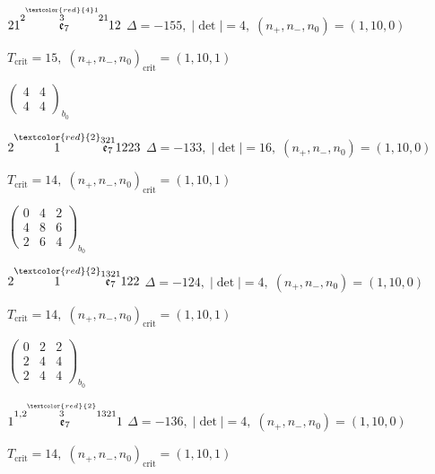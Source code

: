 \documentclass[10pt]{article}
\begin{document}
$21\overset{2\overset{\textcolor{red}{4}1}{3}21}{\mathfrak{e}_7}12$ \quad $\Delta=-155,\; |\det|=4,\; (n_+,n_-,n_0)=(1,10,0)$

\hspace{1em}$T_{\text{crit}}=15,\; (n_+,n_-,n_0)_{\text{crit}}=(1,10,1)$

\hspace{2em}$\left(\begin{smallmatrix}4 & 4 \\ 4 & 4\end{smallmatrix}\right)_{\!b_0}$

\smallskip

$2\overset{\textcolor{red}{2}}{1}\overset{321}{\mathfrak{e}_7}1223$ \quad $\Delta=-133,\; |\det|=16,\; (n_+,n_-,n_0)=(1,10,0)$

\hspace{1em}$T_{\text{crit}}=14,\; (n_+,n_-,n_0)_{\text{crit}}=(1,10,1)$

\hspace{2em}$\left(\begin{smallmatrix}0 & 4 & 2 \\ 4 & 8 & 6 \\ 2 & 6 & 4\end{smallmatrix}\right)_{\!b_0}$

\smallskip

$2\overset{\textcolor{red}{2}}{1}\overset{1321}{\mathfrak{e}_7}122$ \quad $\Delta=-124,\; |\det|=4,\; (n_+,n_-,n_0)=(1,10,0)$

\hspace{1em}$T_{\text{crit}}=14,\; (n_+,n_-,n_0)_{\text{crit}}=(1,10,1)$

\hspace{2em}$\left(\begin{smallmatrix}0 & 2 & 2 \\ 2 & 4 & 4 \\ 2 & 4 & 4\end{smallmatrix}\right)_{\!b_0}$

\smallskip

$1\overset{1,2\overset{\textcolor{red}{2}}{3}1321}{\mathfrak{e}_7}1$ \quad $\Delta=-136,\; |\det|=4,\; (n_+,n_-,n_0)=(1,10,0)$

\hspace{1em}$T_{\text{crit}}=14,\; (n_+,n_-,n_0)_{\text{crit}}=(1,10,1)$
\end{document}
